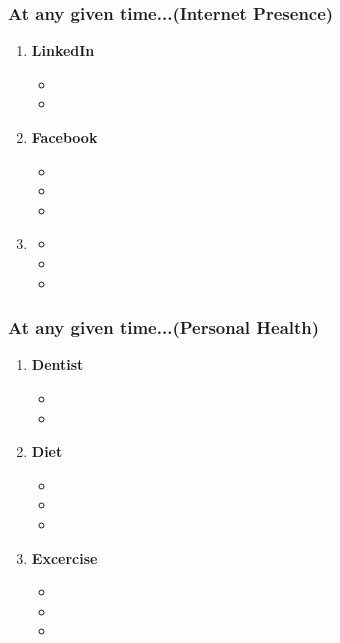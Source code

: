 \begin{frame}
\frametitle{At any given time...(Internet Presence)}
\begin{enumerate}
\item \small \textbf{LinkedIn}
\begin{itemize}
\item \tiny
\item \tiny
\end{itemize}
\item \small \textbf{Facebook}
\begin{itemize}
\item \tiny
\item \tiny
\item \tiny
\end{itemize}
\item \small \textbf{}
\begin{itemize}
\item \tiny
\item \tiny
\item \tiny
\end{itemize}
\end{enumerate}
\end{frame}

\begin{frame}
\frametitle{At any given time...(Personal Health)}
\begin{enumerate}
\item \small \textbf{Dentist}
\begin{itemize}
\item \tiny
\item \tiny
\end{itemize}
\item \small \textbf{Diet}
\begin{itemize}
\item \tiny
\item \tiny
\item \tiny
\end{itemize}
\item \small \textbf{Excercise}
\begin{itemize}
\item \tiny
\item \tiny
\item \tiny
\end{itemize}
\end{enumerate}
\end{frame}

